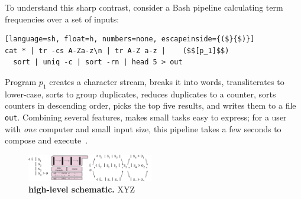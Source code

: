 \documentclass[sigplan,10pt,review,anonymous]{acmart}
\newcommand{\ttt}[1]{\texttt{\small #1}}
\begin{document}
To understand this sharp contrast, consider a Bash pipeline calculating term frequencies over a set of inputs:


\begin{lstlisting}[language=sh, float=h, numbers=none, escapeinside={($}{$)}]
cat * | tr -cs A-Za-z\n | tr A-Z a-z |    ($$[p_1]$$)
  sort | uniq -c | sort -rn | head 5 > out
\end{lstlisting}

\noindent
Program $p_1$ creates a character stream, breaks it into words, transliterates to lower-case, sorts to group duplicates, reduces duplicates to a counter, sorts counters in descending order, picks the top five results, and writes them to a file \ttt{out}.
Combining several features, \unix makes small tasks easy to express;
  for a user with \emph{one} computer and small input size, this pipeline takes a few seconds to compose and execute~\cite{bentley1986literate}.


\begin{figure}[t]
\centering
\includegraphics[width=0.49\textwidth]{./figs/dish_schematic.pdf}
\caption{
  \textbf{\sys high-level schematic.}
	\sys XYZ
}
\label{fig:schematic}
\end{figure}


\end{document}
